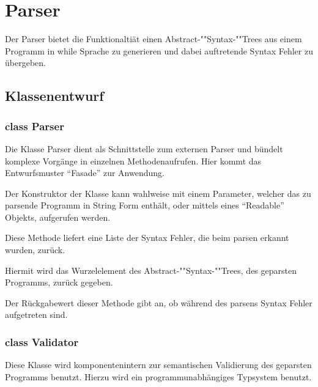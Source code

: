 \section{Parser}

Der Parser bietet die Funktionaltiät einen Abstract-""Syntax-""Trees aus einem Programm in while Sprache zu generieren und dabei auftretende Syntax Fehler zu übergeben.

\subsection{Klassenentwurf}

\subsubsection{class Parser}

Die Klasse Parser dient als Schnittstelle zum externen Parser und bündelt komplexe Vorgänge in einzelnen Methodenaufrufen. Hier kommt das Entwurfsmuster "`Fasade"' zur Anwendung.

\begin{description}
		Der Konstruktor der Klasse kann wahlweise mit einem Parameter, welcher das zu parsende Programm in String Form enthält, oder mittels eines "`Readable"' Objekts, aufgerufen werden.

		Diese Methode liefert eine Liste der Syntax Fehler, die beim parsen erkannt wurden, zurück.
  
		Hiermit wird das Wurzelelement des Abstract-""Syntax-""Trees, des geparsten Programms, zurück gegeben.

		Der Rückgabewert dieser Methode gibt an, ob während des parsens Syntax Fehler aufgetreten sind.
\end{description}

\subsubsection{class Validator}

Diese Klasse wird komponentenintern zur semantischen Validierung des geparsten Programms benutzt. Hierzu wird ein programmunabhängiges Typsystem benutzt.

